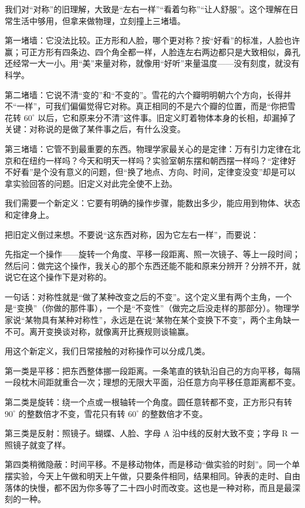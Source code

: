 
我们对“对称”的旧理解，大致是“左右一样”“看着匀称”“让人舒服”。这个理解在日常生活中够用，但拿来做物理，立刻撞上三堵墙。

第一堵墙：它没法比较。正方形和人脸，哪个更对称？按“好看”的标准，人脸也许赢；可正方形有四条边、四个角全都一样，人脸连左右两边都只是大致相似，鼻孔还经常一大一小。用“美”来量对称，就像用“好听”来量温度——没有刻度，就没有科学。

第二堵墙：它说不清“变的”和“不变的”。雪花的六个瓣明明朝六个方向，长得并不“一样”，可我们偏偏觉得它对称。真正相同的不是六个瓣的位置，而是“你把雪花转 \(60^\circ\) 以后，它和原来分不清”这件事。旧定义盯着物体本身的长相，却漏掉了关键：对称说的是做了某件事之后，有什么没变。

第三堵墙：它管不到最重要的东西。物理学家最关心的是定律：万有引力定律在北京和在纽约一样吗？今天和明天一样吗？实验室朝东摆和朝西摆一样吗？“定律好不好看”是个没有意义的问题，但“换了地点、方向、时间，定律变没变”却是可以拿实验回答的问题。旧定义对此完全使不上劲。

我们需要一个新定义：它要有明确的操作步骤，能数出多少，能应用到物体、状态和定律身上。


把旧定义倒过来想。不要说“这东西对称，因为它左右一样”，而要说：

先指定一个操作——旋转一个角度、平移一段距离、照一次镜子、等上一段时间；然后问：做完这个操作，我关心的那个东西还能不能和原来分辨开？分辨不开，就说它在这个操作下是对称的。

一句话：对称性就是“做了某种改变之后的不变”。这个定义里有两个主角，一个是“变换”（你做的那件事），一个是“不变性”（做完之后没走样的那部分）。物理学家说“某物具有某种对称性”，永远是在说“某物在某个变换下不变”，两个主角缺一不可。离开变换谈对称，就像离开比赛规则谈输赢。

用这个新定义，我们日常接触的对称操作可以分成几类。

第一类是平移：把东西整体挪一段距离。一条笔直的铁轨沿自己的方向平移，每隔一段枕木间距就重合一次；理想的无限大平面，沿任意方向平移任意距离都不变。

第二类是旋转：绕一个点或一根轴转一个角度。圆任意转都不变，正方形只有转 \(90^\circ\) 的整数倍才不变，雪花只有转 \(60^\circ\) 的整数倍才不变。

第三类是反射：照镜子。蝴蝶、人脸、字母 A 沿中线的反射大致不变；字母 R 一照镜子就变了样。

第四类稍微隐蔽：时间平移。不是移动物体，而是移动“做实验的时刻”。同一个单摆实验，今天上午做和明天上午做，只要条件相同，结果相同。钟表的走时、自由落体的快慢，都不因为你多等了二十四小时而改变。这也是一种对称，而且是最深刻的一种。

